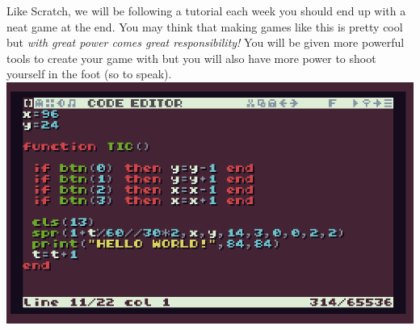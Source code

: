 \documentclass[10pt, twocolumn]{article}
\begin{document}
Like Scratch, we will be following a tutorial each week you should end up with a neat game at the end. You may think that making games like this is pretty cool but \textit{with great power comes great responsibility!} You will be given more powerful tools to create your game with but you will also have more power to shoot yourself in the foot (so to speak).
\includegraphics[width=1\linewidth]{enviro.png}
\end{document}
